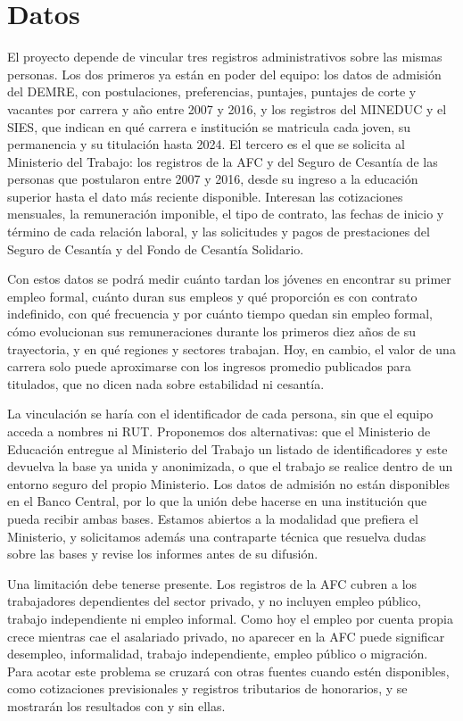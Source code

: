 \documentclass[11pt,a4paper]{article}
\begin{document}
\section{Datos}

El proyecto depende de vincular tres registros administrativos sobre las mismas personas. Los dos primeros ya están en poder del equipo: los datos de admisión del DEMRE, con postulaciones, preferencias, puntajes, puntajes de corte y vacantes por carrera y año entre 2007 y 2016, y los registros del MINEDUC y el SIES, que indican en qué carrera e institución se matricula cada joven, su permanencia y su titulación hasta 2024. El tercero es el que se solicita al Ministerio del Trabajo: los registros de la AFC y del Seguro de Cesantía de las personas que postularon entre 2007 y 2016, desde su ingreso a la educación superior hasta el dato más reciente disponible. Interesan las cotizaciones mensuales, la remuneración imponible, el tipo de contrato, las fechas de inicio y término de cada relación laboral, y las solicitudes y pagos de prestaciones del Seguro de Cesantía y del Fondo de Cesantía Solidario.

Con estos datos se podrá medir cuánto tardan los jóvenes en encontrar su primer empleo formal, cuánto duran sus empleos y qué proporción es con contrato indefinido, con qué frecuencia y por cuánto tiempo quedan sin empleo formal, cómo evolucionan sus remuneraciones durante los primeros diez años de su trayectoria, y en qué regiones y sectores trabajan. Hoy, en cambio, el valor de una carrera solo puede aproximarse con los ingresos promedio publicados para titulados, que no dicen nada sobre estabilidad ni cesantía.

La vinculación se haría con el identificador de cada persona, sin que el equipo acceda a nombres ni RUT. Proponemos dos alternativas: que el Ministerio de Educación entregue al Ministerio del Trabajo un listado de identificadores y este devuelva la base ya unida y anonimizada, o que el trabajo se realice dentro de un entorno seguro del propio Ministerio. Los datos de admisión no están disponibles en el Banco Central, por lo que la unión debe hacerse en una institución que pueda recibir ambas bases. Estamos abiertos a la modalidad que prefiera el Ministerio, y solicitamos además una contraparte técnica que resuelva dudas sobre las bases y revise los informes antes de su difusión.

Una limitación debe tenerse presente. Los registros de la AFC cubren a los trabajadores dependientes del sector privado, y no incluyen empleo público, trabajo independiente ni empleo informal. Como hoy el empleo por cuenta propia crece mientras cae el asalariado privado, no aparecer en la AFC puede significar desempleo, informalidad, trabajo independiente, empleo público o migración. Para acotar este problema se cruzará con otras fuentes cuando estén disponibles, como cotizaciones previsionales y registros tributarios de honorarios, y se mostrarán los resultados con y sin ellas.
\end{document}
